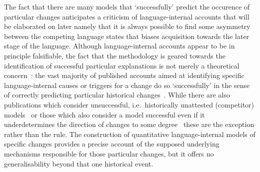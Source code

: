 The fact that there are many models that `successfully' predict the occurence of particular changes anticipates a criticism of language-internal accounts that will be elaborated on later namely that it is always possible to find some asymmetry between the competing language states that biases acquisition towards the later stage of the language.
Although language-internal accounts appear to be in principle falsifiable, the fact that the methodology is geared towards the identification of successful particular explanations is not merely a theoretical concern~\citep{Lass1980}: the vast majority of published accounts aimed at identifying specific language-internal causes or triggers for a change do so `successfully' in the sense of correctly predicting particular historical changes~\citep[e.g.][among many others]{Troutman2008,Ritt2012,VanTrijp2013}. While there are also publications which consider unsuccessful, i.e.~historically unattested (competitor) models~\citep[e.g.][]{Sonderegger2010} or those which also consider a model successful even if it underdetermines the direction of changes to some degree~\citep[e.g.][]{Lau2016} these are the exception rather than the rule.
The construction of quantitative language-internal models of specific changes provides a precise account of the supposed underlying mechanisms responsible for those particular changes, but it offers no generalisability beyond that one historical event. %


